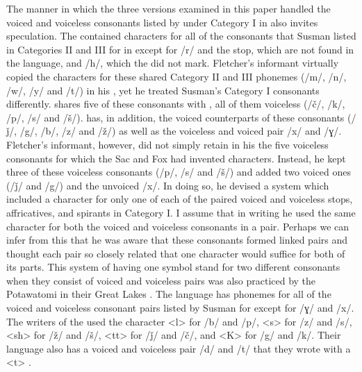 \documentclass[output=paper]{LSP/langsci}
\begin{document}
The manner in which the three  versions examined in this paper handled the voiced and voiceless consonants listed by \citeauthor{Susman1939} under Category I in  also invites speculation. The   contained characters for all of the consonants that Susman listed in Categories II and III for  in  except for /r/ and the  stop, which are not found in the  language, and /h/, which the   did not mark. Fletcher's informant virtually copied the   characters for these shared Category II and III phonemes (/m/, /n/, /w/, /y/ and /t/) in his  , yet he treated Susman's Category I consonants differently.  shares five of these consonants with , all of them voiceless (/\v{c}/, /k/, /p/, /s/ and /\v{s}/).  has, in addition, the voiced counterparts of these consonants (/\v{j}/, /g/, /b/, /z/ and /\v{z}/) as well as the voiceless and voiced pair /x/ and /ɣ/.  Fletcher's informant, however, did not simply retain in his   the five voiceless consonants for which the Sac and Fox had invented  characters.  Instead, he kept three of these voiceless consonants (/p/, /s/ and /\v{s}/) and added two voiced ones (/\v{j}/ and /g/) and the unvoiced /x/. In doing so, he devised a system which included a character for only one of each of the paired  voiced and voiceless stops, affricatives, and spirants in Category I. I assume that in writing he used the same character for both the voiced and voiceless consonants in a pair. Perhaps we can infer from this that he was aware that these consonants formed linked pairs and thought each pair so closely related that one  character would suffice for both of its parts. This system of having one  symbol stand for two different consonants when they consist of voiced and voiceless pairs was also practiced by the Potawatomi in their Great Lakes  . The  language has phonemes for all of the voiced and voiceless consonant pairs listed by Susman for  except for /ɣ/ and /x/. The writers of the   used the character <l> for /b/ and /p/, <s> for /z/ and /s/, <sh> for /\v{z}/ and /\v{s}/, <tt> for /\v{j}/ and /\v{c}/, and <K> for /g/ and /k/. Their language also has a voiced and voiceless pair /d/ and /t/ that they wrote with a <t> \citep[172, Fig. 11]{Walker1996}.  
\end{document}
